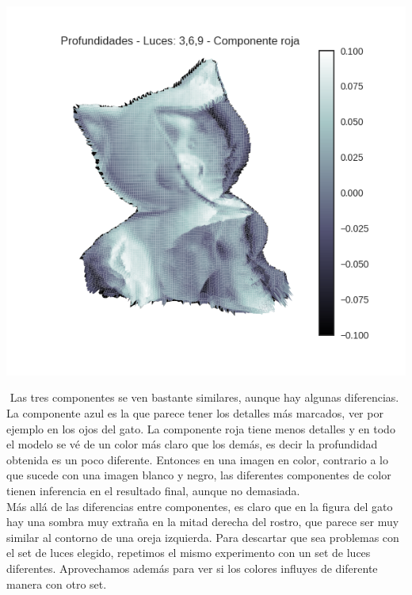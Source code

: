 \begin{figure}[H]
\begin{minipage}{.5\textwidth}
\end{minipage}
\end{figure}

{\centering
  \includegraphics[width=0.5\linewidth]{informe/imagenes/profundidades/gato369Rojo.png}
}

$ $\newline
Las tres componentes se ven bastante similares, aunque hay algunas diferencias. La componente azul es la que parece tener los detalles más marcados, ver por ejemplo en los ojos del gato. La componente roja tiene menos detalles y en todo el modelo se vé de un color más claro que los demás, es decir la profundidad obtenida es un poco diferente. Entonces en una imagen en color, contrario a lo que sucede con una imagen blanco y negro, las diferentes componentes de color tienen inferencia en el resultado final, aunque no demasiada. \\

Más allá de las diferencias entre componentes, es claro que en la figura del gato hay una sombra muy extraña en la mitad derecha del rostro, que parece ser muy similar al contorno de una oreja izquierda. Para descartar que sea problemas con el set de luces elegido, repetimos el mismo experimento con un set de luces diferentes. Aprovechamos además para ver si los colores influyes de diferente manera con otro set. \\

